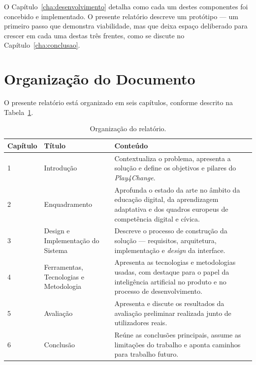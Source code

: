 O Capítulo~\ref{cha:desenvolvimento} detalha como cada um destes componentes foi concebido e implementado. O presente relatório descreve um protótipo --- um primeiro passo que demonstra viabilidade, mas que deixa espaço deliberado para crescer em cada uma destas três frentes, como se discute no Capítulo~\ref{cha:conclusao}.

\section{Organização do Documento}
\label{sec:organizacao-documento}

O presente relatório está organizado em seis capítulos, conforme descrito na Tabela~\ref{tab:organizacao}.

\begin{table}[htbp]
\centering
\caption{Organização do relatório.}
\label{tab:organizacao}
\begin{tabularx}{\textwidth}{@{} l l X @{}}
\toprule
\textbf{Capítulo} & \textbf{Título} & \textbf{Conteúdo} \\
\midrule
1 & Introdução & Contextualiza o problema, apresenta a solução e define os objetivos e pilares do \emph{Play4Change}. \\[4pt]
2 & Enquadramento & Aprofunda o estado da arte no âmbito da educação digital, da aprendizagem adaptativa e dos quadros europeus de competência digital e cívica. \\[4pt]
3 & Design e Implementação do Sistema & Descreve o processo de construção da solução --- requisitos, arquitetura, implementação e \emph{design} da interface. \\[4pt]
4 & Ferramentas, Tecnologias e Metodologia & Apresenta as tecnologias e metodologias usadas, com destaque para o papel da inteligência artificial no produto e no processo de desenvolvimento. \\[4pt]
5 & Avaliação & Apresenta e discute os resultados da avaliação preliminar realizada junto de utilizadores reais. \\[4pt]
6 & Conclusão & Reúne as conclusões principais, assume as limitações do trabalho e aponta caminhos para trabalho futuro. \\
\bottomrule
\end{tabularx}
\end{table}
